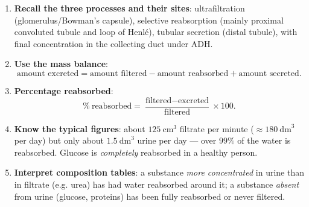 \documentclass[11pt]{article}
\newcommand{\cle}[1]{{\popxbold\color{popdark}#1}}
\begin{document}
\begin{methode}
\begin{enumerate}
\item \textbf{Recall the three processes and their sites}: \cle{ultrafiltration} (glomerulus/Bowman's capsule), \cle{selective reabsorption} (mainly proximal convoluted tubule and loop of Henlé), \cle{tubular secretion} (distal tubule), with final concentration in the collecting duct under \cle{ADH}.
\item \textbf{Use the mass balance}:
\[ \text{amount excreted} = \text{amount filtered} - \text{amount reabsorbed} + \text{amount secreted}. \]
\item \textbf{Percentage reabsorbed}:
\[ \%\ \text{reabsorbed} = \frac{\text{filtered} - \text{excreted}}{\text{filtered}} \times 100. \]
\item \textbf{Know the typical figures}: about $125\ \mathrm{cm}^3$ filtrate per minute ($\approx 180\ \mathrm{dm}^3$ per day) but only about $1.5\ \mathrm{dm}^3$ urine per day — over $99\%$ of the water is reabsorbed. Glucose is \emph{completely} reabsorbed in a healthy person.
\item \textbf{Interpret composition tables}: a substance \emph{more concentrated} in urine than in filtrate (e.g. urea) has had water reabsorbed around it; a substance \emph{absent} from urine (glucose, proteins) has been fully reabsorbed or never filtered.
\end{enumerate}
\end{methode}
\end{document}
